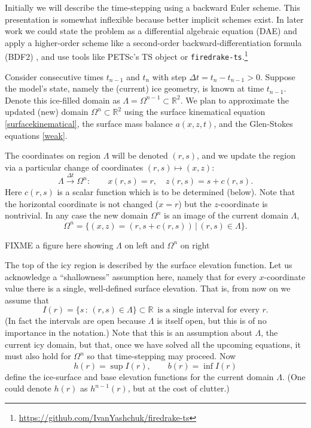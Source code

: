\documentclass[letterpaper,final,12pt,reqno]{amsart}
\newcommand{\RR}{\mathbb{R}}
\begin{document}
Initially we will describe the time-stepping using a backward Euler scheme.  This presentation is somewhat inflexible because better implicit schemes exist.  In later work we could state the problem as a differential algebraic equation (DAE) and apply a higher-order scheme like a second-order backward-differentiation formula (BDF2) \cite{AscherPetzold1998}, and use tools like PETSc's TS object \cite{Balayetal2020,BuelerBook} or \texttt{firedrake-ts}.\footnote{\url{https://github.com/IvanYashchuk/firedrake-ts}}

Consider consecutive times $t_{n-1}$ and $t_n$ with step $\Delta t = t_n - t_{n-1} > 0$.  Suppose the model's state, namely the (current) ice geometry, is known at time $t_{n-1}$.  Denote this ice-filled domain as $\Lambda = \Omega^{n-1} \subset \RR^2$.  We plan to approximate the updated (new) domain $\Omega^n \subset \RR^2$ using the surface kinematical equation \eqref{surfacekinematical}, the surface mass balance $a(x,z,t)$, and the Glen-Stokes equations \eqref{weak}.

The coordinates on region $\Lambda$ will be denoted $(r,s)$, and we update the region via a particular change of coordinates $(r,s) \mapsto (x,z)$:
\begin{equation}
\Lambda \stackrel{\Delta t}{\to} \Omega^n: \qquad x(r,s)=r, \quad z(r,s)=s+c(r,s). \label{changecoords}
\end{equation}
Here $c(r,s)$ is a scalar function which is to be determined (below).  Note that the horizontal coordinate is not changed ($x=r$) but the $z$-coordinate is nontrivial.  In any case the new domain $\Omega^n$ is an image of the current domain $\Lambda$,
\begin{equation}
\Omega^n = \{(x,z)=(r,s+c(r,s)) \,\big|\, (r,s) \in \Lambda\}.  \label{updateddomain}
\end{equation}

FIXME a figure here showing $\Lambda$ on left and $\Omega^n$ on right

The top of the icy region is described by the surface elevation function.  Let us acknowledge a ``shallowness'' assumption here, namely that for every $x$-coordinate value there is a single, well-defined surface elevation.  That is, from now on we assume that
\begin{equation}
I(r) = \{s\,:\,(r,s) \in \Lambda\} \subset \RR \, \text{ is a single interval for every } r.\label{intervalassume}
\end{equation}
(In fact the intervals are open because $\Lambda$ is itself open, but this is of no importance in the notation.)  Note that this is an assumption about $\Lambda$, the current icy domain, but that, once we have solved all the upcoming equations, it must also hold for $\Omega^n$ so that time-stepping may proceed.  Now
    $$h(r) = \sup I(r), \qquad b(r) = \inf I(r)$$
define the ice-surface and base elevation functions for the current domain $\Lambda$.  (One could denote $h(r)$ as $h^{n-1}(r)$, but at the cost of clutter.)
\end{document}
